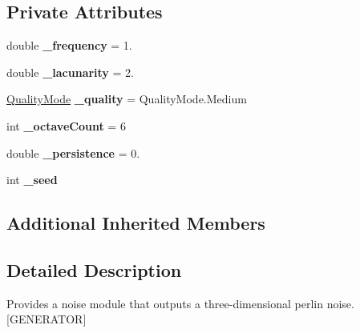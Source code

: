 \subsection*{Private Attributes}
\begin{DoxyCompactItemize}
\item 
\mbox{\label{class_lib_noise_1_1_generator_1_1_perlin_afa84236a4784143aa81553388e569d02}} 
double {\bfseries \+\_\+frequency} = 1.
\item 
\mbox{\label{class_lib_noise_1_1_generator_1_1_perlin_a3abf50219746d5767bd57b1bbb0e4d8b}} 
double {\bfseries \+\_\+lacunarity} = 2.
\item 
\mbox{\label{class_lib_noise_1_1_generator_1_1_perlin_a4beba8358b039c7d9fc7f4c8a5a11c8c}} 
\hyperlink{namespace_lib_noise_ab253d2180e71b8b4b51e250163ca0e27}{Quality\+Mode} {\bfseries \+\_\+quality} = Quality\+Mode.\+Medium
\item 
\mbox{\label{class_lib_noise_1_1_generator_1_1_perlin_a2cacff140eebbcb098d41af365e6f141}} 
int {\bfseries \+\_\+octave\+Count} = 6
\item 
\mbox{\label{class_lib_noise_1_1_generator_1_1_perlin_aba2908ce7d0c3f6116985354a74269e7}} 
double {\bfseries \+\_\+persistence} = 0.
\item 
\mbox{\label{class_lib_noise_1_1_generator_1_1_perlin_af6a2ff60c31280c5557e798dc2d0c9df}} 
int {\bfseries \+\_\+seed}
\end{DoxyCompactItemize}
\subsection*{Additional Inherited Members}


\subsection{Detailed Description}
Provides a noise module that outputs a three-\/dimensional perlin noise. \mbox{[}G\+E\+N\+E\+R\+A\+T\+OR\mbox{]} 



